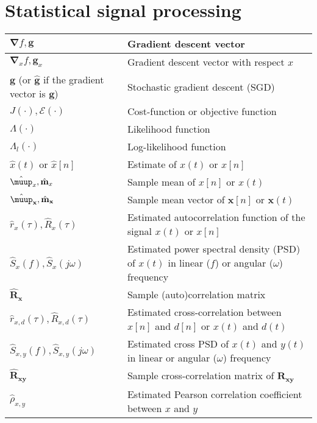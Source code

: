 \documentclass{article}
\begin{document}
\section{Statistical signal processing}
\begin{xltabular}{\textwidth}{XX}
    \(\boldsymbol{\nabla}f, \mathbf{g}\) & Gradient descent vector \\ \hline
    \(\boldsymbol{\nabla}_{x}f, \mathbf{g}_{x}\) & Gradient descent vector with respect \(x\)\\ \hline
    \(\mathbf{g}\) (or \(\hat{\mathbf{g}}\) if the gradient vector is \(\mathbf{g}\)) & Stochastic gradient descent (SGD) \\ \hline
    \(J(\cdot), \mathcal{E}(\cdot)\) & Cost-function or objective function\\ \hline
    \(\Lambda(\cdot)\) & Likelihood function\\ \hline
    \(\Lambda_l(\cdot)\) & Log-likelihood function\\ \hline
    \(\hat{x}(t)\) or \(\hat{x}[n]\) & Estimate of \(x(t)\) or \(x[n]\)\\ \hline
    \(\hat{\boldsymbol{\muup}}_x, \hat{\mathbf{m}}_x\) & Sample mean of \(x[n]\) or \(x(t)\) \\ \hline
    \(\hat{\boldsymbol{\muup}}_\mathbf{x}, \hat{\mathbf{m}}_\mathbf{x}\) & Sample mean vector of \(\mathbf{x}[n]\) or \(\mathbf{x}(t)\)\\ \hline
    \(\hat{r}_x(\tau), \hat{R}_x(\tau)\) & Estimated autocorrelation function of the signal \(x(t)\) or \(x[n]\)\\ \hline
    \(\hat{S}_x(f), \hat{S}_x(j\omega)\) & Estimated power spectral density (PSD) of \(x(t)\) in linear (\(f\)) or angular (\(\omega\)) frequency\\ \hline
    \(\hat{\mathbf{R}}_\mathbf{x}\) & Sample (auto)correlation matrix \\ \hline
    \(\hat{r}_{x,d}(\tau), \hat{R}_{x,d}(\tau)\) & Estimated cross-correlation between \(x[n]\) and \(d[n]\) or \(x(t)\) and \(d(t)\)\\ \hline
    \(\hat{S}_{x,y}(f), \hat{S}_{x,y}(j\omega)\) & Estimated cross PSD of \(x(t)\) and \(y(t)\) in linear or angular (\(\omega\)) frequency\\ \hline
    \(\hat{\mathbf{R}}_\mathbf{xy}\) & Sample cross-correlation matrix of \(\mathbf{R}_\mathbf{xy}\) \\ \hline
    \(\hat{\rho}_{x,y}\) & Estimated Pearson correlation coefficient between \(x\) and \(y\)\\ \hline

\end{xltabular}
\end{document}

